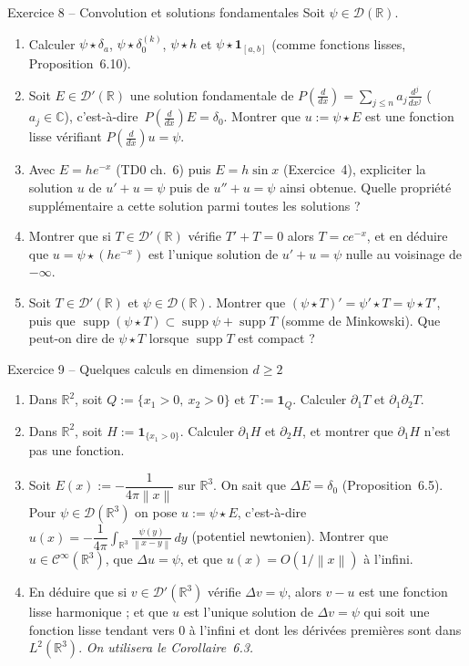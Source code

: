 \documentclass[11pt,a4paper]{article}
\newcommand{\R}{\mathbb{R}}
\newcommand{\C}{\mathbb{C}}
\newcommand{\norm}[1]{\left\|#1\right\|}
\newcommand{\Cinf}{\mathcal{C}^\infty}
\newcommand{\ie}{c'est-à-dire}
\DeclareMathOperator{\supp}{supp}
\newcommand{\D}{\mathcal{D}}
\theoremstyle{definition}
\begin{document}
\begin{exo}{Exercice 8 -- Convolution et solutions fondamentales}
Soit $\psi\in\D(\R)$.
\begin{enumerate}[label=(\alph*)]
  \item Calculer $\psi\star\delta_a$, $\psi\star\delta_0^{(k)}$, $\psi\star h$ et $\psi\star\mathbf 1_{[a,b]}$ (comme fonctions lisses, Proposition~6.10).
  \item Soit $E\in\D'(\R)$ une solution fondamentale de $P(\frac d{dx})=\sum_{j\le n}a_j\frac{d^j}{dx^j}$ ($a_j\in\C$), \ie\ $P(\frac d{dx})E=\delta_0$. Montrer que $u:=\psi\star E$ est une fonction lisse vérifiant $P(\frac d{dx})u=\psi$.
  \item Avec $E=he^{-x}$ (TD0 ch.~6) puis $E=h\sin x$ (Exercice~4), expliciter la solution $u$ de $u'+u=\psi$ puis de $u''+u=\psi$ ainsi obtenue. Quelle propriété supplémentaire a cette solution parmi toutes les solutions ?
  \item Montrer que si $T\in\D'(\R)$ vérifie $T'+T=0$ alors $T=ce^{-x}$, et en déduire que $u=\psi\star(he^{-x})$ est l'unique solution de $u'+u=\psi$ nulle au voisinage de $-\infty$.
  \item Soit $T\in\D'(\R)$ et $\psi\in\D(\R)$. Montrer que $(\psi\star T)'=\psi'\star T=\psi\star T'$, puis que $\supp(\psi\star T)\subset\supp\psi+\supp T$ (somme de Minkowski). Que peut-on dire de $\psi\star T$ lorsque $\supp T$ est compact ?
\end{enumerate}
\end{exo}

\begin{exo}{Exercice 9 -- Quelques calculs en dimension $d\ge2$}
\begin{enumerate}[label=(\alph*)]
  \item Dans $\R^2$, soit $Q:=\{x_1>0,\ x_2>0\}$ et $T:=\mathbf 1_Q$. Calculer $\partial_1T$ et $\partial_1\partial_2T$.
  \item Dans $\R^2$, soit $H:=\mathbf 1_{\{x_1>0\}}$. Calculer $\partial_1H$ et $\partial_2H$, et montrer que $\partial_1H$ n'est pas une fonction.
  \item Soit $E(x):=-\dfrac1{4\pi\norm x}$ sur $\R^3$. On sait que $\Delta E=\delta_0$ (Proposition~6.5). Pour $\psi\in\D(\R^3)$ on pose $u:=\psi\star E$, \ie\ $u(x)=-\dfrac1{4\pi}\displaystyle\int_{\R^3}\frac{\psi(y)}{\norm{x-y}}\,dy$ (potentiel newtonien). Montrer que $u\in\Cinf(\R^3)$, que $\Delta u=\psi$, et que $u(x)=O(1/\norm x)$ à l'infini.
  \item En déduire que si $v\in\D'(\R^3)$ vérifie $\Delta v=\psi$, alors $v-u$ est une fonction lisse harmonique ; et que $u$ est l'unique solution de $\Delta v=\psi$ qui soit une fonction lisse tendant vers $0$ à l'infini et dont les dérivées premières sont dans $L^2(\R^3)$. \emph{On utilisera le Corollaire~6.3.}
\end{enumerate}
\end{exo}
\end{document}
